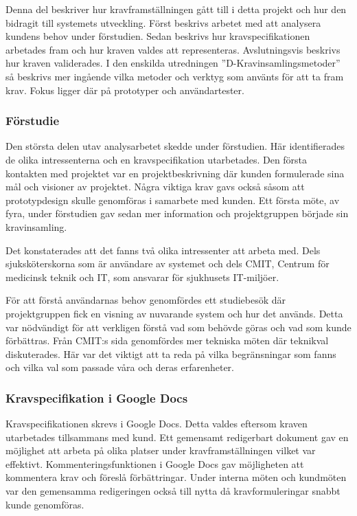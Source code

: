 \documentclass{article}
\begin{document}
Denna del beskriver hur kravframställningen gått till i detta projekt och hur den bidragit till systemets utveckling. Först beskrivs arbetet med att analysera kundens behov under förstudien. Sedan beskrivs hur kravspecifikationen arbetades fram och hur kraven valdes att representeras. Avslutningsvis beskrivs hur kraven validerades. I den enskilda utredningen ''D-Kravinsamlingsmetoder'' så beskrivs mer ingående vilka metoder och verktyg som använts för att ta fram krav. Fokus ligger där på prototyper och användartester.
\subsubsection{Förstudie}
Den största delen utav analysarbetet skedde under förstudien. Här identifierades de olika intressenterna och en kravspecifikation utarbetades. Den första kontakten med projektet var en projektbeskrivning där kunden formulerade sina mål och visioner av projektet. Några viktiga krav gavs också såsom att prototypdesign skulle genomföras i samarbete med kunden. Ett första möte, av fyra, under förstudien gav sedan mer information och projektgruppen började sin kravinsamling. 

Det konstaterades att det fanns två olika intressenter att arbeta med. Dels sjuksköterskorna som är användare av systemet och dels CMIT, Centrum för medicinsk teknik och IT, som ansvarar för sjukhusets IT-miljöer. 

För att förstå användarnas behov genomfördes ett studiebesök där projektgruppen fick en visning av nuvarande system och hur det används. Detta var nödvändigt för att verkligen förstå vad som behövde göras och vad som kunde förbättras. Från CMIT:s sida genomfördes mer tekniska möten där teknikval diskuterades. Här var det viktigt att ta reda på vilka begränsningar som fanns och vilka val som passade våra och deras erfarenheter.

\subsubsection{Kravspecifikation i Google Docs}
Kravspecifikationen skrevs i Google Docs. Detta valdes eftersom kraven utarbetades tillsammans med kund. Ett gemensamt redigerbart dokument gav en möjlighet att arbeta på olika platser under kravframställningen vilket var effektivt. Kommenteringsfunktionen i Google Docs gav möjligheten att kommentera krav och föreslå förbättringar. Under interna möten och kundmöten var den gemensamma redigeringen också till nytta då kravformuleringar snabbt kunde genomföras.
\end{document}

